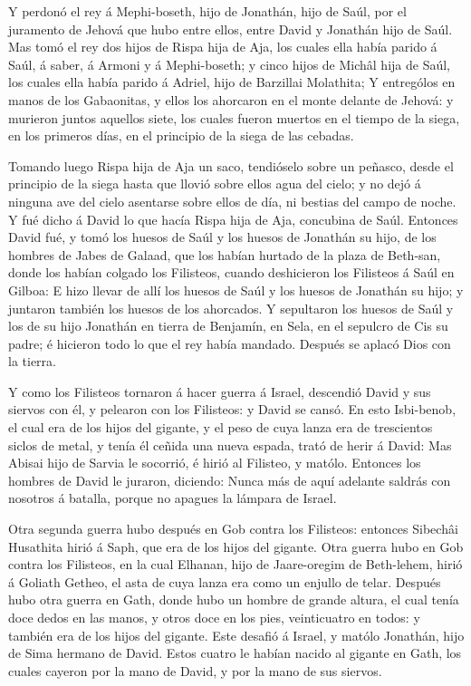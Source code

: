  Y perdonó el rey á Mephi-boseth, hijo de Jonathán, hijo de
Saúl, por el juramento de Jehová que hubo entre ellos, entre David y
Jonathán hijo de Saúl.  Mas tomó el rey dos hijos de Rispa
hija de Aja, los cuales ella había parido á Saúl, á saber, á Armoni y á
Mephi-boseth; y cinco hijos de Michâl hija de Saúl, los cuales ella
había parido á Adriel, hijo de Barzillai Molathita;  Y
entrególos en manos de los Gabaonitas, y ellos los ahorcaron en el monte
delante de Jehová: y murieron juntos aquellos siete, los cuales fueron
muertos en el tiempo de la siega, en los primeros días, en el principio
de la siega de las cebadas.

 Tomando luego Rispa hija de Aja un saco, tendióselo sobre
un peñasco, desde el principio de la siega hasta que llovió sobre ellos
agua del cielo; y no dejó á ninguna ave del cielo asentarse sobre ellos
de día, ni bestias del campo de noche.  Y fué dicho á David
lo que hacía Rispa hija de Aja, concubina de Saúl. 
Entonces David fué, y tomó los huesos de Saúl y los huesos de Jonathán
su hijo, de los hombres de Jabes de Galaad, que los habían hurtado de la
plaza de Beth-san, donde los habían colgado los Filisteos, cuando
deshicieron los Filisteos á Saúl en Gilboa:  E hizo llevar
de allí los huesos de Saúl y los huesos de Jonathán su hijo; y juntaron
también los huesos de los ahorcados.  Y sepultaron los
huesos de Saúl y los de su hijo Jonathán en tierra de Benjamín, en Sela,
en el sepulcro de Cis su padre; é hicieron todo lo que el rey había
mandado. Después se aplacó Dios con la tierra.

 Y como los Filisteos tornaron á hacer guerra á Israel,
descendió David y sus siervos con él, y pelearon con los Filisteos: y
David se cansó.  En esto Isbi-benob, el cual era de los
hijos del gigante, y el peso de cuya lanza era de trescientos siclos de
metal, y tenía él ceñida una nueva espada, trató de herir á David:
 Mas Abisai hijo de Sarvia le socorrió, é hirió al
Filisteo, y matólo. Entonces los hombres de David le juraron, diciendo:
Nunca más de aquí adelante saldrás con nosotros á batalla, porque no
apagues la lámpara de Israel.

 Otra segunda guerra hubo después en Gob contra los
Filisteos: entonces Sibechâi Husathita hirió á Saph, que era de los
hijos del gigante.  Otra guerra hubo en Gob contra los
Filisteos, en la cual Elhanan, hijo de Jaare-oregim de Beth-lehem, hirió
á Goliath Getheo, el asta de cuya lanza era como un enjullo de telar.
 Después hubo otra guerra en Gath, donde hubo un hombre de
grande altura, el cual tenía doce dedos en las manos, y otros doce en
los pies, veinticuatro en todos: y también era de los hijos del gigante.
 Este desafió á Israel, y matólo Jonathán, hijo de Sima
hermano de David.  Estos cuatro le habían nacido al gigante
en Gath, los cuales cayeron por la mano de David, y por la mano de sus
siervos.

